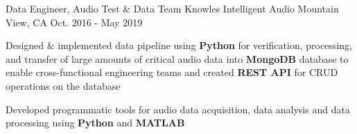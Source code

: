 \begin{cventries}
\cventry
    {Data Engineer, Audio Test \& Data Team} %
    {Knowles Intelligent Audio} %
    {Mountain View, CA} %
    {Oct. 2016 - May 2019} %
    {
      \begin{cvitems} %
 		\item {Designed \& implemented data pipeline using \textbf{Python} for verification, processing, and transfer of large amounts of critical audio data into \textbf{MongoDB} database to enable cross-functional engineering teams and created \textbf{REST API} for CRUD operations on the database}
 	       \item {Developed programmatic tools for audio data acquisition, data analysis and data processing using \textbf{Python} and \textbf{MATLAB}}
      \end{cvitems}
    }




\end{cventries}
